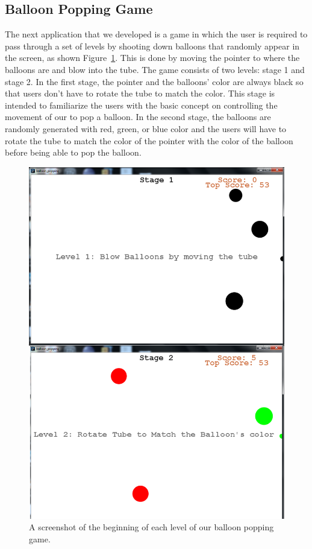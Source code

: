 \subsection{\textbf{Balloon Popping Game}}

The next application that we developed is a game in which the user is required to pass through a set of levels by shooting down balloons that randomly appear in the screen, as shown Figure~\ref{fig:shooting-game}. This is done by moving the pointer to where the balloons are and blow into the tube. The game consists of two levels: stage 1 and stage 2. In the first stage, the pointer and the balloons' color are always black so that users don’t have to rotate the tube to match the color. This stage is intended to familiarize the users with the basic concept on controlling the movement of our \tube to pop a balloon. In the second stage, the balloons are randomly generated with red, green, or blue color and the users will have to rotate the tube to match the color of the pointer with the color of the balloon before being able to pop the balloon.

\begin{figure}
  \centering
  \includegraphics[width=0.70\linewidth]{./figs/tubemaster.png}
  \caption{A screenshot of the beginning of each level of our balloon popping game.}
  \label{fig:shooting-game}
\end{figure}
